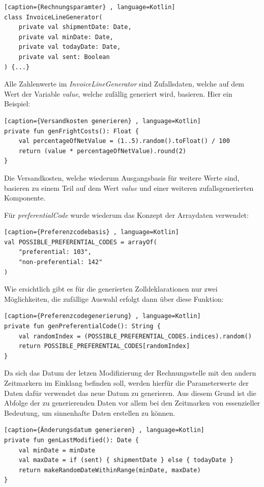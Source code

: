 \begin{lstlisting}[caption={Rechnungsparamter} , language=Kotlin]
class InvoiceLineGenerator(
    private val shipmentDate: Date,
    private val minDate: Date,
    private val todayDate: Date,
    private val sent: Boolean
) {...}
\end{lstlisting}
\vspace{4mm}\par
Alle Zahlenwerte im \textit{InvoiceLineGenerator} sind Zufallsdaten, welche auf dem Wert der Variable \textit{value}, welche zufällig generiert wird, basieren. Hier ein Beispiel:
\begin{lstlisting}[caption={Versandkosten generieren} , language=Kotlin]
private fun genFrightCosts(): Float {
    val percentageOfNetValue = (1..5).random().toFloat() / 100
    return (value * percentageOfNetValue).round(2)
}
\end{lstlisting}
\vspace{4mm}\par
Die Versandkosten, welche wiederum Ausgangsbasis für weitere Werte sind, basieren zu einem Teil auf dem Wert \textit{value} und einer weiteren zufallsgenerierten Komponente.
\vspace{4mm}\par
Für \textit{preferentialCode} wurde wiederum das Konzept der Arraydaten verwendet:
\begin{lstlisting}[caption={Preferenzcodebasis} , language=Kotlin]
val POSSIBLE_PREFERENTIAL_CODES = arrayOf(
    "preferential: 103",
    "non-preferential: 142"
)
\end{lstlisting}
\vspace{4mm}\par
Wie ersichtlich gibt es für die generierten Zolldeklarationen nur zwei Möglichkeiten, die zufällige Auswahl erfolgt dann über diese Funktion:
\begin{lstlisting}[caption={Preferenzcodegenerierung} , language=Kotlin]
private fun genPreferentialCode(): String {
    val randomIndex = (POSSIBLE_PREFERENTIAL_CODES.indices).random()
    return POSSIBLE_PREFERENTIAL_CODES[randomIndex]
}
\end{lstlisting}
\newpage
Da sich das Datum der letzen Modifizierung der Rechnungsstelle mit den andern Zeitmarkern im Einklang befinden soll, werden hierfür die Parameterwerte der Daten dafür verwendet das neue Datum zu generieren. Aus diesem Grund ist die Abfolge der zu generierenden Daten vor allem bei den Zeitmarken von essenzieller Bedeutung, um sinnenhafte Daten erstellen zu können.
\begin{lstlisting}[caption={Änderungsdatum generieren} , language=Kotlin]
private fun genLastModified(): Date {
    val minDate = minDate
    val maxDate = if (sent) { shipmentDate } else { todayDate }
    return makeRandomDateWithinRange(minDate, maxDate)
}
\end{lstlisting}
\vspace{4mm}\par
